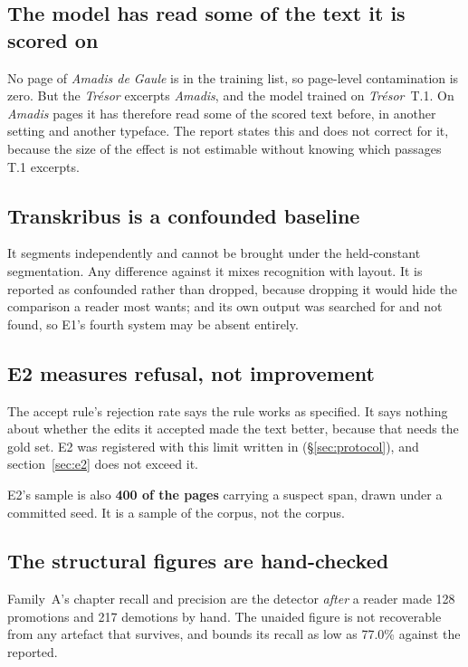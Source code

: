 \subsection{The model has read some of the text it is scored on}

No page of \emph{Amadis de Gaule} is in the training list, so page-level
contamination is zero. But the \emph{Trésor} excerpts \emph{Amadis}, and the
model trained on \emph{Trésor}~T.1. On \emph{Amadis} pages it has therefore
read some of the scored text before, in another setting and another typeface.
The report states this and does not correct for it, because the size of the
effect is not estimable without knowing which passages T.1 excerpts.

\subsection{Transkribus is a confounded baseline}

It segments independently and cannot be brought under the held-constant
segmentation. Any difference against it mixes recognition with layout. It is
reported as confounded rather than dropped, because dropping it would hide the
comparison a reader most wants; and its own output was searched for and not
found, so E1's fourth system may be absent entirely.

\subsection{E2 measures refusal, not improvement}

The accept rule's rejection rate says the rule works as specified. It says
nothing about whether the edits it accepted made the text better, because that
needs the gold set. E2 was registered with this limit written in
(\S\ref{sec:protocol}), and section~\ref{sec:e2} does not exceed it.

E2's sample is also \textbf{400 of the \corrReachPagesWithSpan{} pages}
carrying a suspect span, drawn under a committed
seed. It is a sample of the corpus, not the corpus.

\subsection{The structural figures are hand-checked}

Family~A's chapter recall and precision are the detector \emph{after} a reader
made 128 promotions and 217 demotions by hand. The unaided figure is not
recoverable from any artefact that survives, and
 bounds its
recall as low as 77.0\% against the \structRecallHandCheckedA{} reported.

